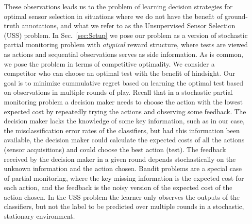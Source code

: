 These observations leads us to the problem of learning decision strategies for optimal sensor selection in situations where we do not have the benefit of ground-truth annotations, and what we refer to as the Unsupervised Sensor Selection (USS) problem. %
In Sec.~\ref{sec:Setup} we pose our problem as a version of stochastic partial monitoring problem \cite{BaFoPaRaSze14} with \emph{atypical} reward structure, where tests are viewed as actions and sequential observations serves as side information. As is common, we pose the problem in terms of competitive optimality. We consider a competitor who can choose an optimal test with the benefit of hindsight. Our goal is to minimize cummulative regret based on learning the optimal test based on observations in multiple rounds of play. %
Recall that in a stochastic partial monitoring problem a decision maker needs to choose the action with the lowest expected cost by repeatedly trying the actions and observing some feedback.
The decision maker lacks the knowledge of some key information, such as in our case, the misclassification
error rates of the classifiers, but had this information been available, the decision maker could calculate the
expected costs of all the actions (sensor acquisitions) and could choose the best action (test). The feedback received by the decision maker in a given round depends stochastically on the unknown information and the action chosen.
Bandit problems \cite{Tho33} are a special case of partial monitoring, where the key missing information is the expected
cost for each action, and the feedback is the noisy version of the expected cost of the action chosen.
In the USS problem the learner only observes the outputs of the classifiers, but not the label to be predicted over multiple rounds
in a stochastic, stationary environment. 


